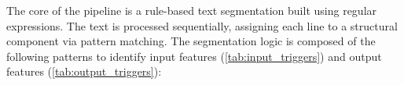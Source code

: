\documentclass[11pt,a4paper]{article}
\begin{document}













The core of the pipeline is a rule-based text segmentation built using regular expressions. The text is processed sequentially, assigning each line to a structural component via pattern matching. The segmentation logic is composed of the following patterns to identify input features (\autoref{tab:input_triggers}) and output features (\autoref{tab:output_triggers}):
\end{document}
